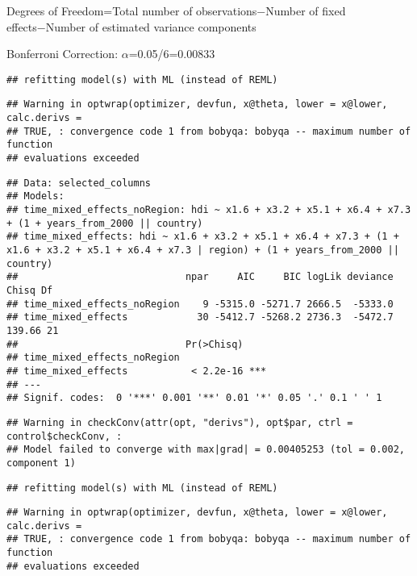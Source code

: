 \documentclass[
]{article}
\begin{document}
Degrees of Freedom=Total number of observations−Number of fixed
effects−Number of estimated variance components

Bonferroni Correction: \(\alpha\)=0.05/6=0.00833

\begin{verbatim}
## refitting model(s) with ML (instead of REML)
\end{verbatim}

\begin{verbatim}
## Warning in optwrap(optimizer, devfun, x@theta, lower = x@lower, calc.derivs =
## TRUE, : convergence code 1 from bobyqa: bobyqa -- maximum number of function
## evaluations exceeded
\end{verbatim}

\begin{verbatim}
## Data: selected_columns
## Models:
## time_mixed_effects_noRegion: hdi ~ x1.6 + x3.2 + x5.1 + x6.4 + x7.3 + (1 + years_from_2000 || country)
## time_mixed_effects: hdi ~ x1.6 + x3.2 + x5.1 + x6.4 + x7.3 + (1 + x1.6 + x3.2 + x5.1 + x6.4 + x7.3 | region) + (1 + years_from_2000 || country)
##                             npar     AIC     BIC logLik deviance  Chisq Df
## time_mixed_effects_noRegion    9 -5315.0 -5271.7 2666.5  -5333.0          
## time_mixed_effects            30 -5412.7 -5268.2 2736.3  -5472.7 139.66 21
##                             Pr(>Chisq)    
## time_mixed_effects_noRegion               
## time_mixed_effects           < 2.2e-16 ***
## ---
## Signif. codes:  0 '***' 0.001 '**' 0.01 '*' 0.05 '.' 0.1 ' ' 1
\end{verbatim}

\begin{verbatim}
## Warning in checkConv(attr(opt, "derivs"), opt$par, ctrl = control$checkConv, :
## Model failed to converge with max|grad| = 0.00405253 (tol = 0.002, component 1)
\end{verbatim}

\begin{verbatim}
## refitting model(s) with ML (instead of REML)
\end{verbatim}

\begin{verbatim}
## Warning in optwrap(optimizer, devfun, x@theta, lower = x@lower, calc.derivs =
## TRUE, : convergence code 1 from bobyqa: bobyqa -- maximum number of function
## evaluations exceeded
\end{verbatim}
\end{document}

